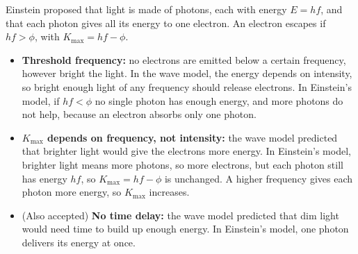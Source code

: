 \documentclass[12pt]{article}
\begin{document}
\ansq
\begin{crit}
\end{crit}
\sample
Einstein proposed that light is made of photons, each with energy $E = hf$, and that each photon gives all
its energy to one electron. An electron escapes if $hf > \phi$, with $K_\mathrm{max} = hf - \phi$.
\begin{itemize}
  \item \textbf{Threshold frequency:} no electrons are emitted below a certain frequency, however bright
        the light. In the wave model, the energy depends on intensity, so bright enough light of any
        frequency should release electrons. In Einstein's model, if $hf < \phi$ no single photon has enough
        energy, and more photons do not help, because an electron absorbs only one photon.
  \item \textbf{$K_\mathrm{max}$ depends on frequency, not intensity:} the wave model predicted that brighter
        light would give the electrons more energy. In Einstein's model, brighter light means more photons,
        so more electrons, but each photon still has energy $hf$, so $K_\mathrm{max} = hf - \phi$ is
        unchanged. A higher frequency gives each photon more energy, so $K_\mathrm{max}$ increases.
  \item (Also accepted) \textbf{No time delay:} the wave model predicted that dim light would need time to
        build up enough energy. In Einstein's model, one photon delivers its energy at once.
\end{itemize}
\end{document}
